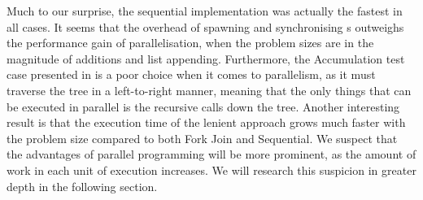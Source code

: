 Much to our surprise, the sequential implementation was actually the fastest in all cases. It seems that the overhead of spawning and synchronising s outweighs the performance gain of parallelisation, when the problem sizes are in the magnitude of additions and list appending. Furthermore, the Accumulation test case presented in \cite{DBLP:journals/cl/Tremblay-parallel} is a poor choice when it comes to parallelism, as it must traverse the tree in a left-to-right manner, meaning that the only things that can be executed in parallel is the recursive calls down the tree. Another interesting result is that the execution time of the lenient approach grows much faster with the problem size compared to both Fork Join and Sequential. We suspect that the advantages of parallel programming will be more prominent, as the amount of work in each unit of execution increases. We will research this suspicion in greater depth in the following section.
